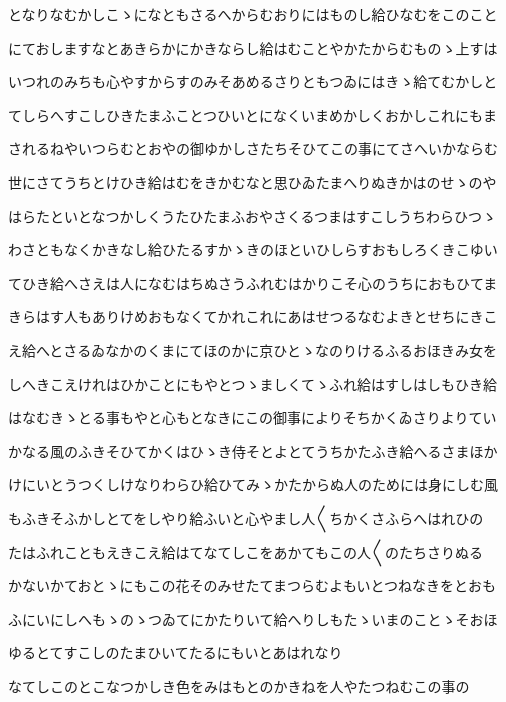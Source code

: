 \documentclass[a4paper,11pt,landscape]{ltjtarticle}
\begin{document}
\par\medskip
となりなむかしこゝになともさるへからむおりにはものし給ひなむをこのこと
\par\medskip
にておしますなとあきらかにかきならし給はむことやかたからむものゝ上すは
\par\medskip
いつれのみちも心やすからすのみそあめるさりともつゐにはきゝ給てむかしと
\par\medskip
てしらへすこしひきたまふことつひいとになくいまめかしくおかしこれにもま
\par\medskip
されるねやいつらむとおやの御ゆかしさたちそひてこの事にてさへいかならむ
\par\medskip
世にさてうちとけひき給はむをきかむなと思ひゐたまへりぬきかはのせゝのや
\par\medskip
はらたといとなつかしくうたひたまふおやさくるつまはすこしうちわらひつゝ
\par\medskip
わさともなくかきなし給ひたるすかゝきのほといひしらすおもしろくきこゆい
\par\medskip
てひき給へさえは人になむはちぬさうふれむはかりこそ心のうちにおもひてま
\par\medskip
きらはす人もありけめおもなくてかれこれにあはせつるなむよきとせちにきこ
\par\medskip
え給へとさるゐなかのくまにてほのかに京ひとゝなのりけるふるおほきみ女を
\par\medskip
しへきこえけれはひかことにもやとつゝましくてゝふれ給はすしはしもひき給
\par\medskip
はなむきゝとる事もやと心もとなきにこの御事によりそちかくゐさりよりてい
\par\medskip
かなる風のふきそひてかくはひゝき侍そとよとてうちかたふき給へるさまほか
\par\medskip
けにいとうつくしけなりわらひ給ひてみゝかたからぬ人のためには身にしむ風
\par\medskip
もふきそふかしとてをしやり給ふいと心やまし人〱ちかくさふらへはれひの
\par\medskip
たはふれこともえきこえ給はてなてしこをあかてもこの人〱のたちさりぬる
\par\medskip
かないかておとゝにもこの花そのみせたてまつらむよもいとつねなきをとおも
\par\medskip
ふにいにしへもゝのゝつゐてにかたりいて給へりしもたゝいまのことゝそおほ
\par\medskip
ゆるとてすこしのたまひいてたるにもいとあはれなり
\par\medskip
なてしこのとこなつかしき色をみはもとのかきねを人やたつねむこの事の
\par\medskip
\end{document}
